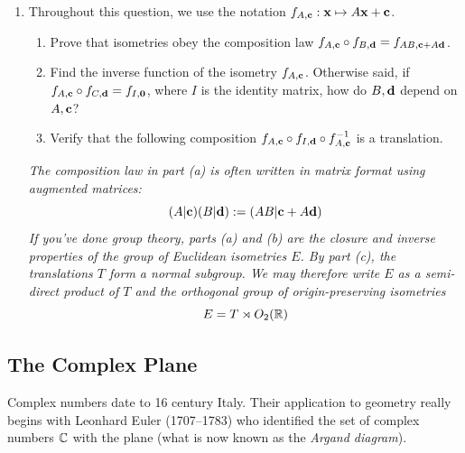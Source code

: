 \begin{exercises}
\begin{enumerate}
  
  \item\label{exs:kleingroup} Throughout this question, we use the notation $f_{A,{\mathbf{c}}}:{\mathbf{x}}\mapsto A{\mathbf{x}}+{\mathbf{c}}$.
  \begin{enumerate}
    \item Prove that isometries obey the composition law $f_{A,{\mathbf{c}}}\circ f_{B,{\mathbf{d}}}=f_{AB,{\mathbf{c}}+A{\mathbf{d}}}$.
    \item Find the inverse function of the isometry $f_{A,{\mathbf{c}}}$. Otherwise said, if $f_{A,{\mathbf{c}}}\circ f_{C,{\mathbf{d}}}=f_{I,{\mathbf{0}}}$, where $I$ is the identity matrix, how do $B,{\mathbf{d}}$ depend on $A,{\mathbf{c}}$?
    \item Verify that the following composition $f_{A,{\mathbf{c}}}\circ f_{I,{\mathbf{d}}}\circ f_{A,{\mathbf{c}}}^{-1}$ is a translation.
  \end{enumerate}
	\emph{The composition law in part (a) is often written in matrix format using augmented matrices:
	\[(A|{\mathbf{c}})(B|{\mathbf{d}}):=(AB|{\mathbf{c}}+A{\mathbf{d}})\]
	If you've done group theory, parts (a) and (b) are the closure and inverse properties of the group of Euclidean isometries $E$. By part (c), the translations $T$ form a normal subgroup. We may therefore write $E$ as a semi-direct product of $T$ and the orthogonal group of origin-preserving isometries
	\[E=T\rtimes O_2(\mathbb{R})\]}

\end{enumerate}
\end{exercises}

\clearpage



\subsection{The Complex Plane}\label{sec:complexplane}

Complex numbers date to 16\th{} century Italy. Their application to geometry really begins with Leonhard Euler (1707--1783) who identified the set of complex numbers $\mathbb{C}$ with the plane (what is now known as the \emph{Argand diagram}).

